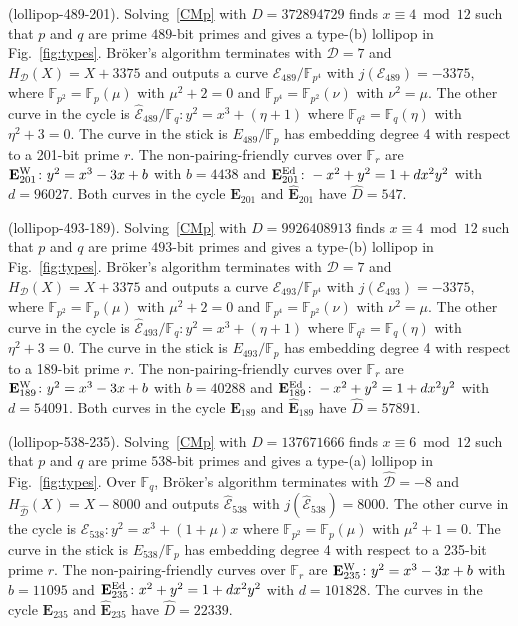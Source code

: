 \documentclass[version=preprint]{iacrcc}
\newcommand{\F}{\mathbb{F}}
\newcommand{\EC}{\mathcal{E}}
\newcommand{\D}{\mathcal{D}}
\begin{document}
\begin{example}(\textsf{lollipop-489-201}). \label{example:489-201} Solving~\eqref{CMp} with $D=372894729$ finds $x \equiv 4 \bmod{12}$ such that $p$ and $q$ are prime $489$-bit primes and gives a type-(b) lollipop in Fig.~\ref{fig:types}. Br{\"o}ker's algorithm terminates with $\D=7$ and $H_\D(X)=  X + 3375$ and outputs a curve ${\EC}_{489}/\F_{p^4}$ with $j({\EC}_{489})=-3375$, where $\F_{p^2}=\F_p(\mu)$ with $\mu^2+2=0$ and $\F_{p^4}=\F_{p^2}(\nu)$ with $\nu^2=\mu$. The other curve in the cycle is $\hat{\EC}_{489}/\F_q \colon y^2=x^3+(\eta+1)$ where  $\F_{q^2}=\F_q(\eta)$ with $\eta^2+3=0$. The curve in the stick is $E_{489}/\F_p$ has embedding degree 4 with respect to a 201-bit prime $r$. The non-pairing-friendly curves over $\F_r$ are $\mathbf{E}_{201}^{\rm W} \colon y^2=x^3-3x+b$ with $b=4438$ and $\mathbf{E}_{201}^{\rm Ed} \colon -x^2+y^2=1+dx^2y^2$ with $d=96027$. Both curves in the cycle $\mathbf{E}_{201}$ and $\hat{\mathbf{E}}_{201}$ have $\hat{D}=547$. 
\end{example}

\begin{example}(\textsf{lollipop-493-189}). \label{example:493-189} Solving~\eqref{CMp} with $D=9926408913$ finds $x \equiv 4 \bmod{12}$ such that $p$ and $q$ are prime $493$-bit primes and gives a type-(b) lollipop in Fig.~\ref{fig:types}. Br{\"o}ker's algorithm terminates with $\D=7$ and $H_\D(X)=  X + 3375$ and outputs a curve ${\EC}_{493}/\F_{p^4}$ with $j({\EC}_{493})=-3375$, where $\F_{p^2}=\F_p(\mu)$ with $\mu^2+2=0$ and $\F_{p^4}=\F_{p^2}(\nu)$ with $\nu^2=\mu$. The other curve in the cycle is $\hat{\EC}_{493}/\F_q \colon y^2=x^3+(\eta+1)$ where  $\F_{q^2}=\F_q(\eta)$ with $\eta^2+3=0$. The curve in the stick is $E_{493}/\F_p$ has embedding degree 4 with respect to a 189-bit prime $r$. The non-pairing-friendly curves over $\F_r$ are $\mathbf{E}_{189}^{\rm W} \colon y^2=x^3-3x+b$ with $b=40288$ and $\mathbf{E}_{189}^{\rm Ed} \colon -x^2+y^2=1+dx^2y^2$ with $d=54091$. Both curves in the cycle $\mathbf{E}_{189}$ and $\hat{\mathbf{E}}_{189}$ have $\hat{D}=57891$. 
\end{example}

\begin{example}(\textsf{lollipop-538-235}). \label{example:538-235} Solving~\eqref{CMp} with $D=137671666$ finds $x \equiv 6 \bmod{12}$ such that $p$ and $q$ are prime $538$-bit primes and gives a type-(a) lollipop in Fig.~\ref{fig:types}. Over $\F_q$, Br{\"o}ker's algorithm terminates with $\hat{\D}=-8$ and $H_{\hat{\D}}(X)= X -8000$ and outputs $\hat{\EC}_{538}$ with $j(\hat{\EC}_{538}) =8000$. The other curve in the cycle is ${\EC}_{538} \colon y^2=x^3+(1+\mu)x$  where $\F_{p^2}=\F_p(\mu)$ with $\mu^2+1=0$. The curve in the stick is $E_{538}/\F_p$ has embedding degree 4 with respect to a 235-bit prime $r$. The non-pairing-friendly curves over $\F_r$ are $\mathbf{E}_{235}^{\rm W} \colon y^2=x^3-3x+b$ with $b=11095$ and $\mathbf{E}_{235}^{\rm Ed} \colon x^2+y^2=1+dx^2y^2$ with $d=101828$. The curves in the cycle $\mathbf{E}_{235}$ and $\hat{\mathbf{E}}_{235}$ have $\hat{D}=22339$. 
\end{example}
\end{document}
